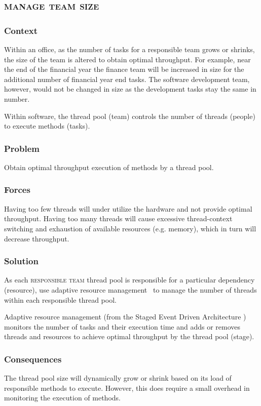 \documentclass[prodmode]{style/acmlarge}
\begin{document}
\subsection{\textsc{\textbf{manage team size}}}

\subsubsection*{Context} Within an office, as the number of tasks for a
responsible team grows or shrinks, the size of the team is altered to obtain
optimal throughput.  For example, near the end of the financial year the finance
team will be increased in size for the additional number of financial year end
tasks.  The software development team, however, would not be changed in size as
the development tasks stay the same in number.

Within software, the thread pool (team) controls the number of threads (people)
to execute methods (tasks).

\subsubsection*{\textbf{Problem}} Obtain optimal throughput execution of methods by a
thread pool.

\subsubsection*{Forces} Having too few threads will under utilize the hardware
and not provide optimal throughput.  Having too many threads will cause
excessive thread-context switching and exhaustion of available resources (e.g.
memory), which in turn will decrease throughput.

\subsubsection*{\textbf{Solution}} As each \textsc{responsible team} thread pool
is responsible for a particular dependency (resource), use adaptive resource
management~\cite{seda} to manage the number of threads within each responsible
thread pool.

Adaptive resource management (from the Staged Event Driven Architecture
\cite{seda}) monitors the number of tasks and their execution time and
adds or removes threads and resources to achieve optimal throughput by the thread
pool (stage).

\subsubsection*{Consequences} The thread pool size will dynamically grow or
shrink based on its load of responsible methods to execute.  However, this does
require a small overhead in monitoring the execution of methods.
\end{document}
